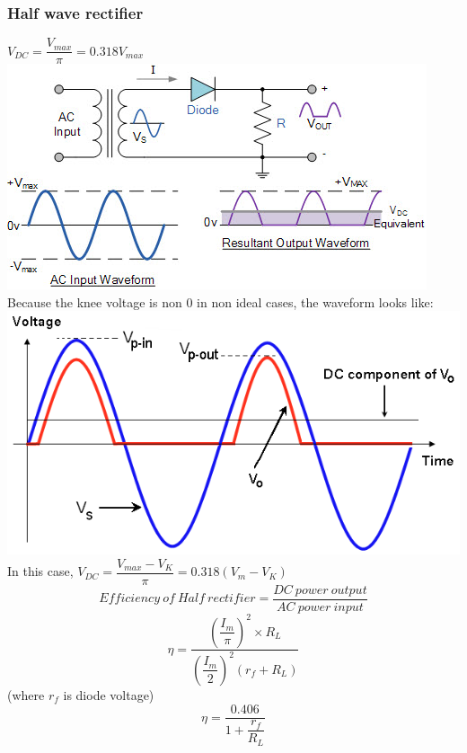 \documentclass[10pt, a4paper]{report}
\begin{document}
		\subsubsection{Half wave rectifier}
		$ V_{DC} =  \dfrac{V_{max}}{\pi}  = 0.318 V_{max} $
		\includegraphics[width=\linewidth]{img/half rectifier}
		\\
		Because the knee voltage is non 0 in non ideal cases, the waveform looks like: \\
		\includegraphics[width=0.5\linewidth]{img/half rectifier waveform} \\
		In this case, 		$ V_{DC} = \dfrac{V_{max} - V_K}{\pi}  = 0.318 (V_m - V_K)$\\
		$$ Efficiency\ of\ Half\ rectifier = \dfrac{DC\ power\ output}{AC\ power\ input} $$
		$$\eta = \dfrac{(\dfrac{I_m}{\pi})^2 \times R_L}{(\dfrac{I_m}{2})^2(r_f + R_L)}$$ (where $ r_f  $ is diode voltage)
		$$ \eta = \dfrac{0.406}{1+\dfrac{r_f}{R_L}} $$
		
\end{document}
